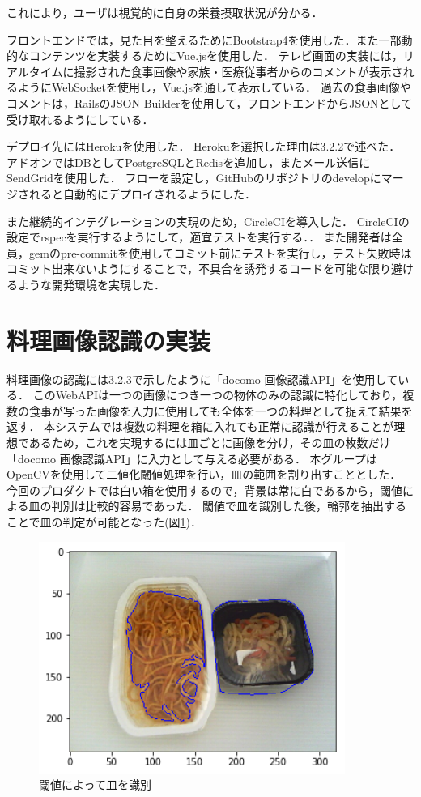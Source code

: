 \documentclass[../report]{subfiles}
\begin{document}
これにより，ユーザは視覚的に自身の栄養摂取状況が分かる．

フロントエンドでは，見た目を整えるためにBootstrap4を使用した．また一部動的なコンテンツを実装するためにVue.jsを使用した．
テレビ画面の実装には，リアルタイムに撮影された食事画像や家族・医療従事者からのコメントが表示されるようにWebSocketを使用し，Vue.jsを通して表示している．
過去の食事画像やコメントは，RailsのJSON Builderを使用して，フロントエンドからJSONとして受け取れるようにしている．

デプロイ先にはHerokuを使用した．
Herokuを選択した理由は3.2.2で述べた．
アドオンではDBとしてPostgreSQLとRedisを追加し，またメール送信にSendGridを使用した．
フローを設定し，GitHubのリポジトリのdevelopにマージされると自動的にデプロイされるようにした．

また継続的インテグレーションの実現のため，CircleCIを導入した．
CircleCIの設定でrspecを実行するようにして，適宜テストを実行する．．
また開発者は全員，gemのpre-commitを使用してコミット前にテストを実行し，テスト失敗時はコミット出来ないようにすることで，不具合を誘発するコードを可能な限り避けるような開発環境を実現した．


\section{料理画像認識の実装}
料理画像の認識には3.2.3で示したように「docomo 画像認識API」を使用している．
このWebAPIは一つの画像につき一つの物体のみの認識に特化しており，複数の食事が写った画像を入力に使用しても全体を一つの料理として捉えて結果を返す．
本システムでは複数の料理を箱に入れても正常に認識が行えることが理想であるため，これを実現するには皿ごとに画像を分け，その皿の枚数だけ「docomo 画像認識API」に入力として与える必要がある．
本グループはOpenCVを使用して二値化閾値処理を行い，皿の範囲を割り出すこととした．
今回のプロダクトでは白い箱を使用するので，背景は常に白であるから，閾値による皿の判別は比較的容易であった．
閾値で皿を識別した後，輪郭を抽出することで皿の判定が可能となった(図\ref{fig:6-threshold})．

\begin{figure}[htbp]
    \begin{center}
        \includegraphics[width=10cm]{imgs/6-threshold.png}
        \caption{閾値によって皿を識別}
        \label{fig:6-threshold}
    \end{center}
\end{figure}
\end{document}
